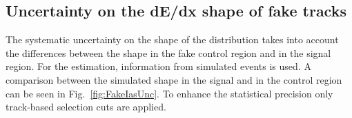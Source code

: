 \renewcommand{\arraystretch}{1.5}
\begin{table}[!h]
\centering
\caption{Fake rates in simulated \WJets and \ZlepJets events for different event-based selections of the \WJets sample. The track-based selection is the candidate track selection from Table~\ref{tab:SummaryCuts}.}
\label{tab:FakeRateUnc}
\end{table}

\subsection{Uncertainty on the dE/dx shape of fake tracks}
\label{sec:FakeIasUncertainty}
The systematic uncertainty on the shape of the \ias distribution takes into account the differences between the \ias shape in the fake control region \fakeCR and in the signal region.
For the estimation, information from simulated \WJets events is used.
A comparison between the simulated \ias shape in the signal and in the control region can be seen in Fig.~\ref{fig:FakeIasUnc}.
To enhance the statistical precision only track-based selection cuts are applied.

